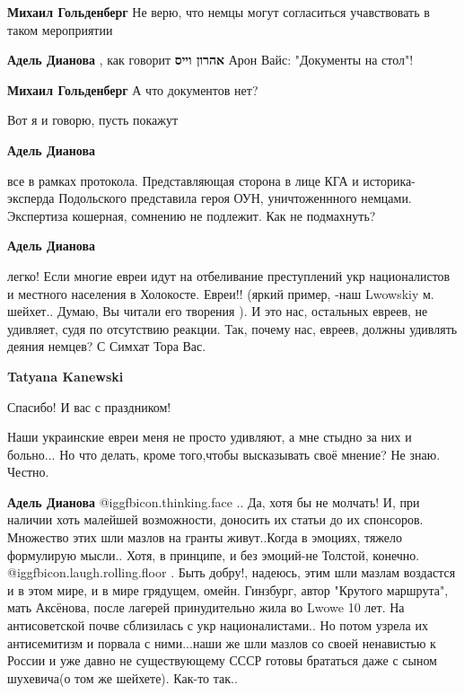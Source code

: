 \begin{itemize}
\begin{itemize}
\textbf{Михаил Гольденберг} Не верю, что немцы могут согласиться учавствовать в таком мероприятии

\textbf{Адель Дианова} , как говорит \textbf{אהרון וייס} Арон Вайс: "Документы на стол"!

\textbf{Михаил Гольденберг} А что документов нет?

Вот я и говорю, пусть покажут


\textbf{Адель Дианова} 

все в рамках протокола. Представляющая сторона в лице КГА и историка-эксперда
Подольского представила героя ОУН, уничтоженнного немцами. Экспертиза кошерная,
сомнению не подлежит. Как не подмахнуть?

\textbf{Адель Дианова} 

легко! Если многие евреи идут на отбеливание преступлений укр националистов и
местного населения в Холокосте. Евреи!! (яркий пример, -наш Lwowskiy м.
шейхет.. Думаю, Вы читали его творения ). И это нас, остальных евреев, не
удивляет, судя по отсутствию реакции. Так, почему нас, евреев, должны удивлять
деяния немцев? С Симхат Тора Вас.


\textbf{Tatyana Kanewski} 

Спасибо! И вас с праздником!

Наши украинские евреи меня не просто удивляют, а мне стыдно за них и больно...
Но что делать, кроме того,чтобы высказывать своё мнение? Не знаю. Честно.

\textbf{Адель Дианова}  @igg{fbicon.thinking.face} .. Да, хотя бы не молчать! И, при наличии хоть малейшей возможности, доносить их статьи до их спонсоров. Множество этих шли мазлов на гранты живут..Когда в эмоциях, тяжело формулирую мысли.. Хотя, в принципе, и без эмоций-не Толстой, конечно.  @igg{fbicon.laugh.rolling.floor} . Быть добру!, надеюсь, этим шли мазлам воздастся и в этом мире, и в мире грядущем, омейн. Гинзбург, автор "Крутого маршрута", мать Аксёнова, после лагерей принудительно жила во Lwowe 10 лет. На антисоветской почве сблизилась с укр националистами.. Но потом узрела их антисемитизм и порвала с ними...наши же шли мазлов со своей ненавистью к России и уже давно не существующему СССР готовы брататься даже с сыном шухевича(о том же шейхете). Как-то так..


\end{itemize}
\end{itemize}
